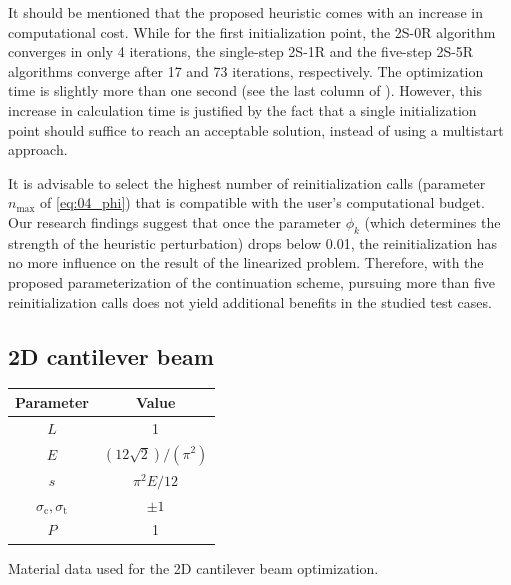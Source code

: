 It should be mentioned that the proposed heuristic comes with an increase in computational cost. While for the first initialization point, the 2S-0R algorithm converges in only 4 iterations, the single-step 2S-1R and the five-step 2S-5R algorithms converge after 17 and 73 iterations, respectively. The optimization time is slightly more than one second (see the last column of ). However, this increase in calculation time is justified by the fact that a single initialization point should suffice to reach an acceptable solution, instead of using a multistart approach.

It is advisable to select the highest number of reinitialization calls (parameter $n_{\text{max}}$ of \eqref{eq:04_phi}) that is compatible with the user's computational budget. Our research findings suggest that once the parameter $\phi_k$ (which determines the strength of the heuristic perturbation) drops below 0.01, the reinitialization has no more influence on the result of the linearized problem. Therefore, with the proposed parameterization of the continuation scheme, pursuing more than five reinitialization calls does not yield additional benefits in the studied test cases.

\subsection{2D cantilever beam}
\label{sec:04_2dcant}
\begin{margintable}
    \small
    \centering
    \begin{tabular}{cc}
    \toprule
    \textbf{Parameter}        & \textbf{Value} \\ \midrule
    $L$ & 1 \\
    $E$              & $(12\sqrt{2})/(\pi^2)$     \\
    $s$ & $\pi^2 E / 12$ \\
    $\sigma_\text{c}, \sigma_\text{t}$ & $\pm 1$ \\
    $P$              & 1   \\
    \bottomrule
    \end{tabular}
    \caption{Material data used for the 2D cantilever beam optimization.}
    \label{tab:04_2D_cand_mat}
\end{margintable}

